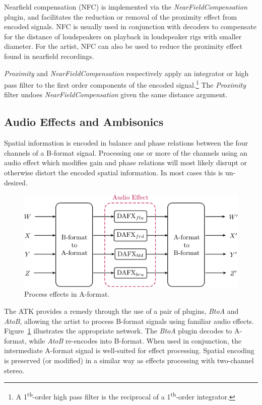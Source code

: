 \documentclass{article}
\begin{document}
Near\-field compensation (NFC) is implemented via the \emph{NearFieldCompensation} plugin, and facilitates the reduction or removal of the proximity effect from encoded signals.
NFC is usually used in conjunction with decoders to compensate for the distance of loudspeakers on playback in loudspeaker rigs with smaller diameter. For the artist, NFC can also be used to reduce the proximity effect found in nearfield recordings.

\emph{Proximity} and \emph{NearFieldCompensation} respectively apply an integrator or high pass filter to the first order components of the encoded signal.\footnote{A 1\textsuperscript{th}-order high pass filter is the reciprocal of a 1\textsuperscript{th}-order integrator.} The \emph{Proximity} filter undoes \emph{NearFieldCompensation} given the same distance argument.


\subsection{Audio Effects and Ambisonics}\label{sec:a-format}

Spatial information is encoded in balance and phase relations between the four channels of a B-format signal.
Processing one or more of the channels using an audio effect which modifies gain and phase relations will most likely disrupt or otherwise distort the encoded spatial information. In most cases this is un-desired.

\begin{figure}[h]
\captionsetup{aboveskip=-6pt}
\centering
\includegraphics[width=1.0\columnwidth]{figures/DAFXNetwork.png}
\setlength{\abovecaptionskip}{0pt plus 3pt minus 2pt} %
\caption{Process effects in A-format.\label{fig:aToB}}
\end{figure}

The ATK provides a remedy through the use of a pair of plugins, \emph{BtoA} and \emph{AtoB}, allowing the artist to process B-format signals using familiar audio effects.
Figure~\ref{fig:aToB} illustrates the appropriate network. The \emph{BtoA} plugin decodes to A-format, while \emph{AtoB} re-encodes into B-format.
When used in conjunction, the intermediate A-format signal is well-suited for effect processing. Spatial encoding is preserved (or modified) in a similar way as effects processing with two-channel stereo.
\end{document}
